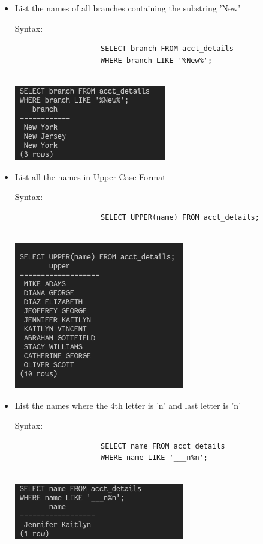 \documentclass[13pt,oneside]{book}
\begin{document}
\begin{itemize}
					
					\item
					List the names of all branches containing the substring 'New’
					 
					Syntax:
					\begin{verbatim}
					SELECT branch FROM acct_details
					WHERE branch LIKE '%New%';
					
					\end{verbatim}
					\includegraphics[]{img/p6/ss2.png}
					
					
					\item
					List all the names in Upper Case Format
					 
					Syntax:
					\begin{verbatim}
					SELECT UPPER(name) FROM acct_details;
					
					\end{verbatim}
					\includegraphics[]{img/p6/ss3.png}
					
					
					\item
					List the names where the 4th letter is 'n’ and last letter is 'n’
					 
					Syntax:
					\begin{verbatim}
					SELECT name FROM acct_details
					WHERE name LIKE '___n%n';
					
					\end{verbatim}
					\includegraphics[]{img/p6/ss4.png}
					

\end{itemize}
\end{document}
